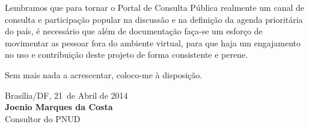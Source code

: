 \documentclass[11pt]{article}
\newcommand{\MyName}{Joenio Marques da Costa}
\newcommand{\MesEntrega}{Abril de 2014}
\newcommand{\DiaEntrega}{21}
\begin{document}
Lembramos que para tornar o Portal de Consulta Pública realmente um canal de
consulta e participação popular na discussão e na definição da agenda
prioritária do país, é necessário que além de documentação faça-se um esforço
de movimentar as pessoar fora do ambiente virtual, para que haja um
engajamento no uso e contribuição deste projeto de forma consistente e perene.

\vspace{1cm}

Sem mais nada a acrescentar, coloco-me à disposição.

\vspace{1cm}

\begin{minipage}{\textwidth}
  Brasília/DF, \DiaEntrega \ de \MesEntrega\\[1cm]
  \textbf{\MyName}\\
  \small Consultor do PNUD
\end{minipage}
\end{document}
